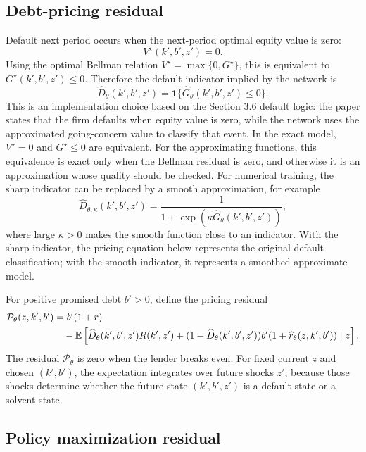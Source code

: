 \documentclass[11pt]{article}
\newcommand{\E}{\mathbb{E}}
\newcommand{\1}{\mathbf{1}}
\begin{document}
\subsection{Debt-pricing residual}

Default next period occurs when the next-period optimal equity value is zero:
\[
  V^\star(k',b',z')=0.
\]
Using the optimal Bellman relation \(V^\star=\max\{0,G^\star\}\), this is
equivalent to \(G^\star(k',b',z')\le 0\). Therefore the default indicator implied
by the network is
\begin{equation}
  \widehat D_\theta(k',b',z')
  =
  \1\{\widehat G_\theta(k',b',z')\le 0\}.
  \label{eq:default-indicator}
\end{equation}
This is an implementation choice based on the Section 3.6 default logic: the
paper states that the firm defaults when equity value is zero, while the network
uses the approximated going-concern value to classify that event. In the exact
model, \(V^\star=0\) and \(G^\star\le 0\) are equivalent. For the approximating
functions, this equivalence is exact only when the Bellman residual is zero, and
otherwise it is an approximation whose quality should be checked. For numerical
training, the sharp indicator can be replaced by a smooth approximation, for
example
\[
  \widehat D_{\theta,\kappa}(k',b',z')
  =
  \frac{1}{1+\exp(\kappa \widehat G_\theta(k',b',z'))},
\]
where large \(\kappa>0\) makes the smooth function close to an indicator. With
the sharp indicator, the pricing equation below represents the original default
classification; with the smooth indicator, it represents a smoothed approximate
model.

For positive promised debt \(b'>0\), define the pricing residual
\begin{align}
  \mathcal P_\theta(z,k',b')
  &=
  b'(1+r) \notag\\
  &\quad
  -
  \E\left[
    \widehat D_\theta(k',b',z')R(k',z')
    +(1-\widehat D_\theta(k',b',z'))b'(1+\widehat r_\theta(z,k',b'))
    \mid z
  \right].
  \label{eq:pricing-residual}
\end{align}
The residual \(\mathcal P_\theta\) is zero when the lender breaks even.
For fixed current \(z\) and chosen \((k',b')\), the expectation integrates over
future shocks \(z'\), because those shocks determine whether the future state
\((k',b',z')\) is a default state or a solvent state.

\subsection{Policy maximization residual}
\end{document}
